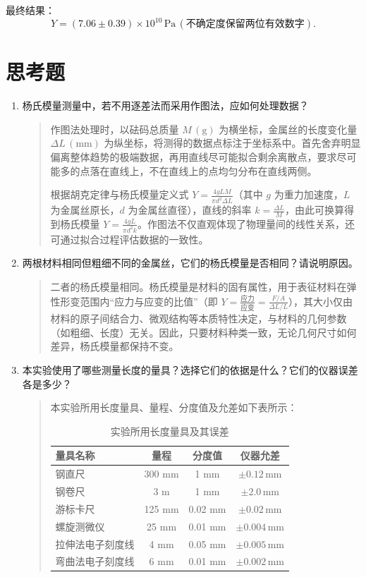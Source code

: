 \documentclass[11pt]{article}
\begin{document}
最终结果：
\[ \boxed{Y = (7.06 \pm 0.39) \times 10^{10} \, \text{Pa}} \, (\text{不确定度保留两位有效数字}). \]

     
\section{思考题}
\begin{enumerate}
    \item[7.1.1] 杨氏模量测量中，若不用逐差法而采用作图法，应如何处理数据？
    \begin{quote}
    作图法处理时，以砝码总质量 \( M \, (\text{g}) \) 为横坐标，金属丝的长度变化量 \( \Delta L \, (\text{mm}) \) 为纵坐标，将测得的数据点标注于坐标系中。首先舍弃明显偏离整体趋势的极端数据，再用直线尽可能拟合剩余离散点，要求尽可能多的点落在直线上，不在直线上的点均匀分布在直线两侧。

    根据胡克定律与杨氏模量定义式 \( Y = \frac{4gLM}{\pi d^2 \Delta L} \)（其中 \( g \) 为重力加速度，\( L \) 为金属丝原长，\( d \) 为金属丝直径），直线的斜率 \( k = \frac{\Delta L}{M} \)，由此可换算得到杨氏模量 \( Y = \frac{4gL}{\pi d^2 k} \)。作图法不仅直观体现了物理量间的线性关系，还可通过拟合过程评估数据的一致性。
    \end{quote}

    \item[7.1.2] 两根材料相同但粗细不同的金属丝，它们的杨氏模量是否相同？请说明原因。
    \begin{quote}
    二者的杨氏模量相同。杨氏模量是材料的固有属性，用于表征材料在弹性形变范围内“应力与应变的比值”（即 \( Y = \frac{\text{应力}}{\text{应变}} = \frac{F/A}{\Delta L/L} \)），其大小仅由材料的原子间结合力、微观结构等本质特性决定，与材料的几何参数（如粗细、长度）无关。因此，只要材料种类一致，无论几何尺寸如何差异，杨氏模量都保持不变。
    \end{quote}

    \item[7.1.3] 本实验使用了哪些测量长度的量具？选择它们的依据是什么？它们的仪器误差各是多少？
    \begin{quote}
    本实验所用长度量具、量程、分度值及允差如下表所示：
    \begin{table}[h]
    \centering
    \caption{实验所用长度量具及其误差}
    \begin{tabular}{lccc}
    \toprule
    量具名称       & 量程   & 分度值 & 仪器允差       \\
    \midrule
    钢直尺         & 300 mm & 1 mm   & \( \pm 0.12 \, \text{mm} \) \\
    钢卷尺         & 3 m    & 1 mm   & \( \pm 2.0 \, \text{mm} \)  \\
    游标卡尺       & 125 mm & 0.02 mm& \( \pm 0.02 \, \text{mm} \) \\
    螺旋测微仪     & 25 mm  & 0.01 mm& \( \pm 0.004 \, \text{mm} \)\\
    拉伸法电子刻度线 & 4 mm  & 0.05 mm& \( \pm 0.005 \, \text{mm} \)\\
    弯曲法电子刻度线 & 6 mm  & 0.01 mm& \( \pm 0.002 \, \text{mm} \)\\
    \bottomrule
    \end{tabular}
    \end{table}


\end{quote}
\end{enumerate}
\end{document}
